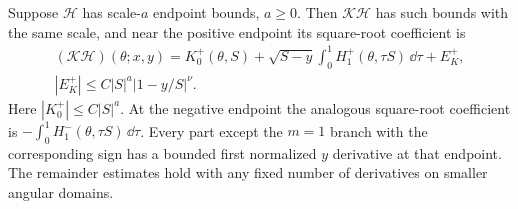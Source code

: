 \begin{lmm}\label{lmm:b:linear-endpoint}
Suppose $\mathcal H$ has scale-$a$ endpoint bounds, $a\geq0$.
Then $\mathcal K\mathcal H$ has such bounds with the same scale,
and near the positive endpoint its square-root coefficient is
\begin{equation}\label{eq:b:linear-endpoint}
 \begin{aligned}
 (\mathcal K\mathcal H)(\theta;x,y)
 =K_0^+(\theta,S)
   +\sqrt{S-y}\int_0^1H_1^+(\theta,\tau S)\,\dd\tau+E_K^+,\\
 |E_K^+|\leq C|S|^a|1-y/S|^\nu.
 \end{aligned}
\end{equation}
Here $|K_0^+|\leq C|S|^a$. At the negative endpoint the analogous
square-root coefficient is
$-\int_0^1H_1^-(\theta,\tau S)\,\dd\tau$.
Every part except the $m=1$ branch with the corresponding sign
has a bounded first normalized $y$ derivative at that endpoint.
The remainder estimates hold with any fixed number of derivatives
on smaller angular domains.
\end{lmm}
